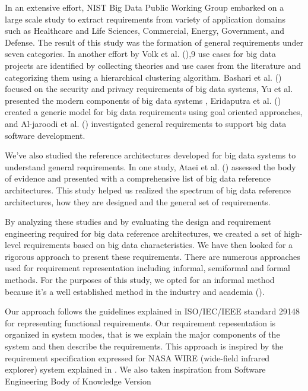 \documentclass[conference]{IEEEtran}
\begin{document}
In an extensive effort, NIST Big Data Public Working Group embarked on a large scale study to extract requirements from variety of application domains such as Healthcare and Life Sciences, Commercial, Energy, Government, and Defense. The result of this study was the formation of general requirements under seven categories. In another effort by Volk et al. (\cite{volk2020identifying}),9 use cases for big data projects are identified by collecting theories and use cases from the literature and categorizing them using a hierarchical clustering algorithm. Bashari et al. (\cite{bashari2016security}) focused on the security and privacy requirements of big data systems, Yu et al. presented the modern components of big data systems \cite{yu2019components}, Eridaputra et al. (\cite{eridaputra2014modeling}) created a generic model for big data requirements using goal oriented approaches, and Al-jaroodi et al. (\cite{al2016characteristics}) investigated general requirements to support big data software development. 

We've also studied the reference architectures developed for big data systems to understand general requirements. In one study, Ataei et al. (\cite{ataei2020big}) assessed the body of evidence and presented with a comprehensive list of big data reference architectures. This study helped us realized the spectrum of big data reference architectures, how they are designed and the general set of requirements.  

By analyzing these studies and by evaluating the design and requirement engineering required for big data reference architectures, we created a set of high-level requirements based on big data characteristics. We have then looked for a rigorous approach to present these requirements. There are numerous approaches used for requirement representation including informal, semiformal and formal methods. For the purposes of this study, we opted for an informal method because it's a well established method in the industry and academia (\cite{kassab2014state}). 

Our approach follows the guidelines explained in ISO/IEC/IEEE standard 29148 for representing functional requirements. Our requirement repesentation is organized in system modes, that is we explain the major components of the system and then describe the requirements. This approach is inspired by the requirement specification expressed for NASA WIRE (wide-field infrared explorer) system explained in \cite{laplante2017requirements}. We also taken inspiration from Software Engineering Body of Knowledge Version
\end{document}
